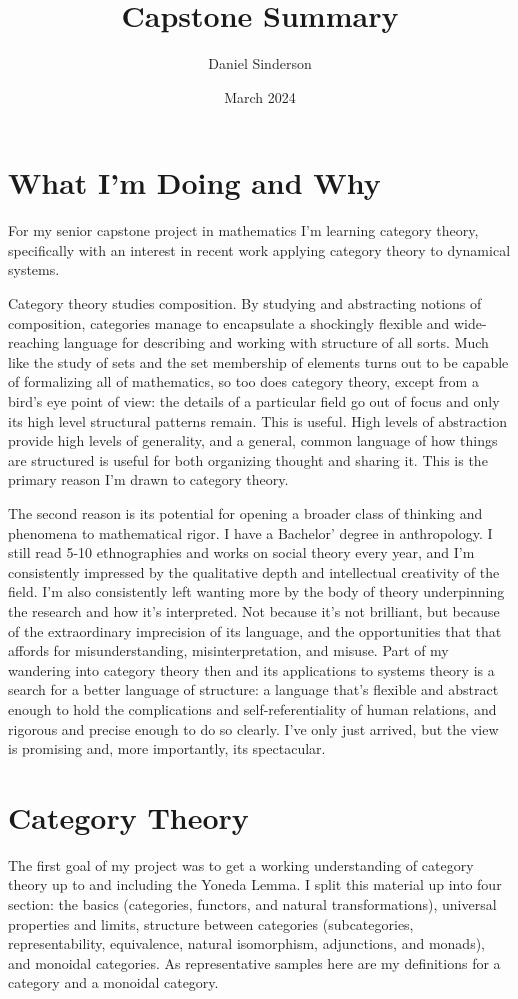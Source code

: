 \documentclass{article}
\title{Capstone Summary}
\author{Daniel Sinderson}
\date{March 2024}
\theoremstyle{definition}
\begin{document}
\maketitle

\section*{What I'm Doing and Why}
For my senior capstone project in mathematics I'm learning category theory,
specifically with an interest in recent work applying category theory to dynamical systems.

Category theory studies composition.
By studying and abstracting notions of composition, categories manage to encapsulate
a shockingly flexible and wide-reaching language for describing and working with structure of all sorts.
Much like the study of sets and the set membership of elements turns out to be capable of formalizing all of mathematics,
so too does category theory, except from a bird's eye point of view:
the details of a particular field go out of focus and only its high level structural patterns remain.
This is useful.
High levels of abstraction provide high levels of generality,
and a general, common language of how things are structured is useful for both organizing thought and sharing it.
This is the primary reason I'm drawn to category theory.

The second reason is its potential for opening a broader class of thinking and phenomena to mathematical rigor.
I have a Bachelor' degree in anthropology.
I still read 5-10 ethnographies and works on social theory every year,
and I'm consistently impressed by the qualitative depth and intellectual creativity of the field.
I'm also consistently left wanting more by the body of theory underpinning the research and how it's interpreted.
Not because it's not brilliant, but because of the extraordinary imprecision of its language,
and the opportunities that that affords for misunderstanding, misinterpretation, and misuse.
Part of my wandering into category theory then and its applications to systems theory
is a search for a better language of structure: a language that's flexible and abstract enough
to hold the complications and self-referentiality of human relations, and rigorous and precise enough
to do so clearly.
I've only just arrived, but the view is promising and, more importantly, its spectacular.


\section*{Category Theory}
The first goal of my project was to get a working understanding of category theory up to and including the Yoneda Lemma.
I split this material up into four section: the basics (categories, functors, and natural transformations), universal properties and limits, structure between categories (subcategories, representability, equivalence, natural isomorphism, adjunctions, and monads), and monoidal categories.
As representative samples here are my definitions for a category and a monoidal category.
\end{document}
